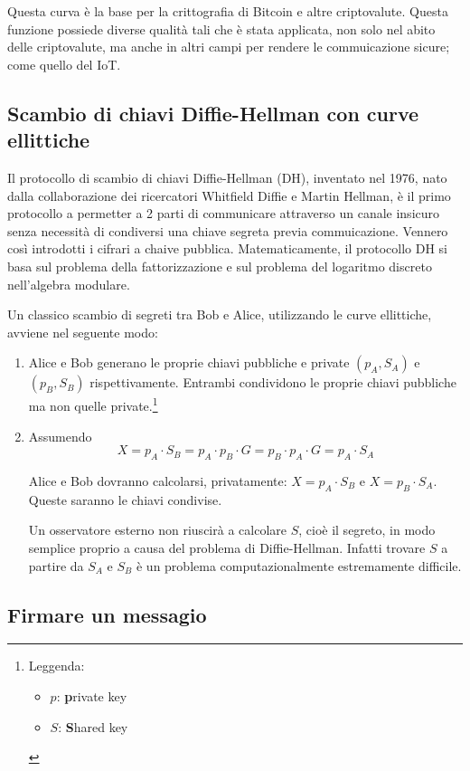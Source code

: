 \documentclass[12pt,a4paper]{article}
\begin{document}
Questa curva è la base per la crittografia di Bitcoin e altre criptovalute.
Questa funzione possiede diverse qualità tali che è stata applicata, non solo
nel abito delle criptovalute, ma anche in altri campi per rendere le
commuicazione sicure; come quello del IoT. 

\subsection{Scambio di chiavi Diffie-Hellman con curve ellittiche}
Il protocollo di scambio di chiavi Diffie-Hellman (DH), inventato nel 1976, nato
dalla collaborazione dei ricercatori Whitfield Diffie e Martin Hellman, è il
primo protocollo a permetter a 2 parti di communicare attraverso un canale
insicuro senza necessità di condiversi una chiave segreta previa commuicazione.
Vennero così introdotti i cifrari a chaive pubblica. Matematicamente, il
protocollo DH si basa sul problema della fattorizzazione e sul problema del
logaritmo discreto nell'algebra modulare.

Un classico scambio di segreti tra Bob e Alice, utilizzando le curve ellittiche,
avviene nel seguente modo:

\begin{enumerate}
    \item Alice e Bob generano le proprie chiavi pubbliche e private $ (p_A,
    S_A) $ e $ (p_B, S_B) $ rispettivamente. Entrambi condividono le proprie
    chiavi pubbliche ma non quelle private.\footnote{Leggenda:
    \begin{itemize}
        \item $ p $: \textbf{p}rivate key
        \item $ S $: \textbf{S}hared key \end{itemize}}
    \item Assumendo
        $$ X = p_A \cdot S_B = p_A \cdot p_B \cdot G = p_B \cdot p_A \cdot G =
        p_A \cdot S_A $$

        Alice e Bob dovranno calcolarsi, privatamente: $ X = p_A \cdot S_B $ e $ X =
        p_B \cdot S_A $. Queste saranno le chiavi condivise.

        Un osservatore esterno non riuscirà a calcolare $ S $, cioè il segreto, in
        modo semplice proprio a causa del problema di Diffie-Hellman. Infatti
        trovare $ S $ a partire da $ S_A $ e $ S_B $ è un problema
        computazionalmente estremamente difficile.
\end{enumerate}

\subsection{Firmare un messagio}
\end{document}
